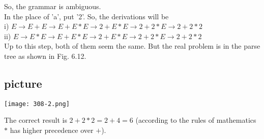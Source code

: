 \documentclass[9pt]{beamer}
\begin{document}
\begin{frame}

\small{
So, the grammar is ambiguous.\\
In the place of 'a', put '2'. So, the derivations will be\\
i) $E \rightarrow E + E \rightarrow E + E*E \rightarrow 2 + E*E \rightarrow 2 + 2*E \rightarrow 2 + 2*2$ \\
ii) $E \rightarrow E*E \rightarrow E + E*E \rightarrow 2 + E*E \rightarrow 2 + 2*E \rightarrow 2 + 2*2$ \\
Up to this step, both of them seem the same. But the real problem is in the parse tree as shown in Fig. 6.12.}\\

\begin{center}
\section{picture}
\texttt{[image: 308-2.png]}
\end{center}

\small{
\hspace*{0.5cm} The correct result is $2 + 2*2 = 2 + 4 = 6$ (according to the rules of mathematics $*$ has higher precedence
over $+$).}\\
\end{frame}
\end{document}
